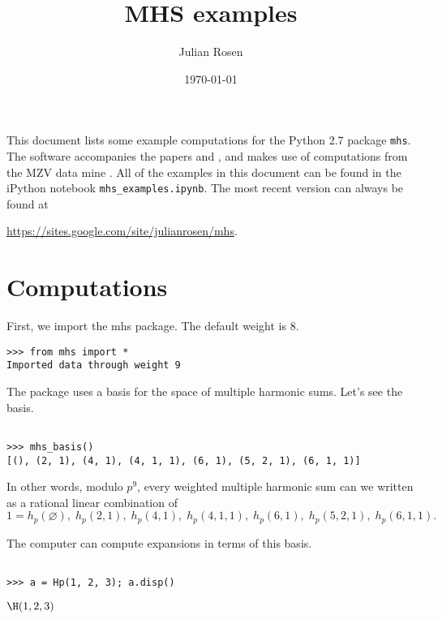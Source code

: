 \documentclass[12pt]{amsart}
\theoremstyle{plain}
\theoremstyle{definition}
\theoremstyle{remark}
\def\hp{h_{p}}
\begin{document}
\title{MHS examples}
\author{Julian Rosen}
\date{\today}
\maketitle

This document lists some example computations for the Python 2.7 package \verb|mhs|. The software accompanies the papers \cite{Ros16a} and \cite{Ros16b}, and makes use of computations from the MZV data mine \cite{Blu10}. All of the examples in this document can be found in the iPython notebook \verb|mhs_examples.ipynb|. The most recent version can always be found at
\begin{center}
\url{https://sites.google.com/site/julianrosen/mhs}.
\end{center}

\section{Computations}


\noindent First, we import the mhs package. The default weight is $8$.
\bigskip

\begin{verbatim}
>>> from mhs import *
Imported data through weight 9
\end{verbatim}
\bigskip

\noindent The package uses a basis for the space of multiple harmonic sums. Let's see the basis.

\begin{verbatim}

>>> mhs_basis()
[(), (2, 1), (4, 1), (4, 1, 1), (6, 1), (5, 2, 1), (6, 1, 1)]

\end{verbatim}

\noindent In other words, modulo $p^9$, every weighted multiple harmonic sum can we written as a rational linear combination of
\[
1=\hp(\varnothing),\; \hp(2,1),\;\hp(4,1),\;\hp(4,1,1),\;\hp(6,1),\;\hp(5,2,1),\;\hp(6,1,1).
\]
\bigskip

\noindent The computer can compute expansions in terms of this basis.

\begin{verbatim}

>>> a = Hp(1, 2, 3); a.disp()
\end{verbatim}
$\displaystyle\H(1,2,3)$
\end{document}
